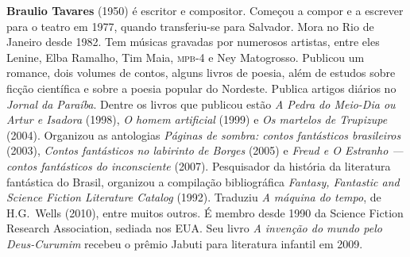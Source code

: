 \textbf{Braulio Tavares} (1950) é escritor e compositor. Começou a compor e a escrever 
para o teatro em 1977, quando transferiu-se para Salvador. Mora no Rio de Janeiro desde 1982. 
Tem músicas gravadas por numerosos artistas, entre eles Lenine, Elba Ramalho, Tim Maia, \textsc{mpb}-4 
e Ney Matogrosso. Publicou um romance, dois volumes de contos, alguns livros de poesia, além de 
estudos sobre ficção científica e sobre a poesia popular do Nordeste. Publica artigos diários 
no \textit{Jornal da Paraíba}. Dentre os livros que publicou estão \textit{A Pedra do 
Meio-Dia ou Artur e Isadora} (1998), \textit{O homem artificial} (1999) e \textit{Os martelos de Trupizupe}
(2004). Organizou as antologias \textit{Páginas de sombra: contos fantásticos brasileiros} (2003), 
\textit{Contos fantásticos no labirinto de Borges} (2005) e \textit{Freud e 
O Estranho --- contos fantásticos do inconsciente} (2007). Pesquisador da história da literatura fantástica 
do Brasil, organizou a compilação bibliográfica \textit{Fantasy, Fantastic and 
Science Fiction Literature Catalog} (1992). Traduziu \textit{A máquina do tempo}, 
de H.G.~Wells (2010), entre muitos outros. É membro desde 1990 da Science 
Fiction Research Association, sediada nos EUA. Seu livro \textit{A invenção do mundo pelo Deus-Curumim} 
recebeu o prêmio Jabuti para literatura infantil em 2009.


